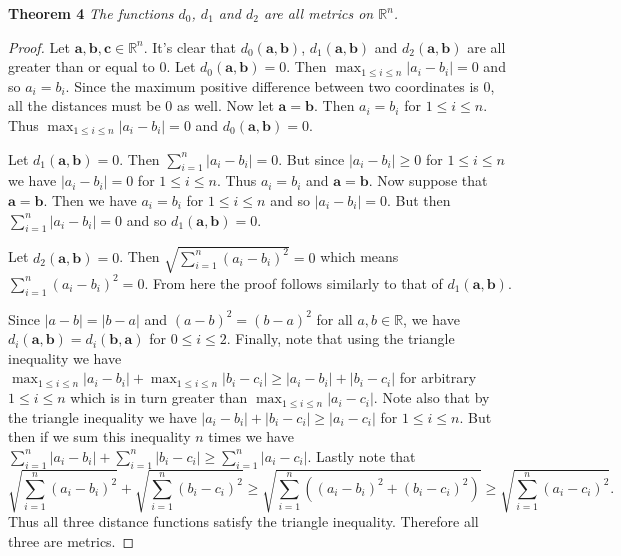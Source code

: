 \documentclass{article}
\begin{document}
\begin{flushleft}
\textbf{Theorem 4}
\textsl{The functions $d_0$, $d_1$ and $d_2$ are all metrics on $\mathbb{R}^n$.}
\begin{proof}
Let $\mathbf{a}, \mathbf{b}, \mathbf{c} \in \mathbb{R}^n$. It's clear that $d_0(\mathbf{a},\mathbf{b})$, $d_1(\mathbf{a},\mathbf{b})$ and $d_2(\mathbf{a},\mathbf{b})$ are all greater than or equal to $0$. Let $d_0(\mathbf{a},\mathbf{b}) = 0$. Then $\max_{1 \leq i \leq n} |a_i - b_i| = 0$ and so $a_i = b_i$. Since the maximum positive difference between two coordinates is $0$, all the distances must be $0$ as well. Now let $\mathbf{a} = \mathbf{b}$. Then $a_i = b_i$ for $1 \leq i \leq n$. Thus $\max_{1 \leq i \leq n} |a_i - b_i| = 0$ and $d_0(\mathbf{a},\mathbf{b}) = 0$.\newline

Let $d_1(\mathbf{a},\mathbf{b}) = 0$. Then $\sum_{i=1}^{n} |a_i - b_i| = 0$. But since $|a_i - b_i| \geq 0$ for $1 \leq i \leq n$ we have $|a_i - b_i| = 0$ for $1 \leq i \leq n$. Thus $a_i = b_i$ and $\mathbf{a} = \mathbf{b}$. Now suppose that $\mathbf{a}=\mathbf{b}$. Then we have $a_i = b_i$ for $1 \leq i \leq n$ and so $|a_i - b_i| = 0$. But then $\sum_{i=1}^{n} |a_i - b_i| = 0$ and so $d_1(\mathbf{a},\mathbf{b}) = 0$.\newline

Let $d_2(\mathbf{a},\mathbf{b}) = 0$. Then $\sqrt{\sum_{i=1}^{n} (a_i-b_i)^2} = 0$ which means $\sum_{i=1}^{n} (a_i-b_i)^2 = 0$. From here the proof follows similarly to that of $d_1(\mathbf{a},\mathbf{b})$.\newline

Since $|a-b| = |b-a|$ and $(a-b)^2 = (b-a)^2$ for all $a,b \in \mathbb{R}$, we have $d_i(\mathbf{a},\mathbf{b}) = d_i(\mathbf{b},\mathbf{a})$ for $0 \leq i \leq 2$. Finally, note that using the triangle inequality we have $\max_{1 \leq i \leq n} |a_i-b_i| + \max_{1 \leq i \leq n} |b_i-c_i| \geq |a_i-b_i|+|b_i-c_i|$ for arbitrary $1 \leq i \leq n$ which is in turn greater than $\max_{1 \leq i \leq n} |a_i - c_i|$. Note also that by the triangle inequality we have $|a_i - b_i| + |b_i - c_i| \geq |a_i - c_i|$ for $1 \leq i \leq n$. But then if we sum this inequality $n$ times we have $\sum_{i=1}^n |a_i - b_i| + \sum_{i=1}^n |b_i - c_i| \geq \sum_{i=1}^n |a_i-c_i|$. Lastly note that
\[
\sqrt{\sum_{i=1}^n (a_i-b_i)^2} + \sqrt{\sum_{i=1}^n (b_i-c_i)^2} \geq \sqrt{\sum_{i=1}^n \left ( (a_i-b_i)^2 + (b_i-c_i)^2 \right ) } \geq \sqrt{\sum_{i=1}^n (a_i-c_i)^2}.
\]
Thus all three distance functions satisfy the triangle inequality. Therefore all three are metrics.
\end{proof}


\end{flushleft}
\end{document}
